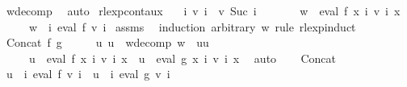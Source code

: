 \begin{isabellebody}
\ w{\isacharunderscore}{\kern0pt}decomp\ \isamarkupfalse%
\ auto\isanewline
{}\isamarkupfalse%
%
\endisatagproof
{\isafoldproof}%
%
\isadelimproof
\isanewline
%
\endisadelimproof
\isanewline
{}\isamarkupfalse%
\ rlexp{\isacharunderscore}{\kern0pt}cont{\isacharunderscore}{\kern0pt}aux{}{\isacharcolon}{\kern0pt}\isanewline
\ \ \ {\isachardoublequoteopen}{\isasymforall}i{\isachardot}{\kern0pt}\ v\ i\ {\isasymle}\ v\ {\isacharparenleft}{\kern0pt}Suc\ i{\isacharparenright}{\kern0pt}{\isachardoublequoteclose}\isanewline
\ \ \ \ \ \ \ {\isachardoublequoteopen}w\ {\isasymin}\ eval\ f\ {\isacharparenleft}{\kern0pt}{\isasymlambda}x{\isachardot}{\kern0pt}\ {\isasymUnion}i{\isachardot}{\kern0pt}\ v\ i\ x{\isacharparenright}{\kern0pt}{\isachardoublequoteclose}\isanewline
\ \ \ \ \ {\isachardoublequoteopen}w\ {\isasymin}\ {\isacharparenleft}{\kern0pt}{\isasymUnion}i{\isachardot}{\kern0pt}\ eval\ f\ {\isacharparenleft}{\kern0pt}v\ i{\isacharparenright}{\kern0pt}{\isacharparenright}{\kern0pt}{\isachardoublequoteclose}\isanewline
%
\isadelimproof
%
\endisadelimproof
%
\isatagproof
{}\isamarkupfalse%
\ assms\ \isamarkupfalse%
\ {\isacharparenleft}{\kern0pt}induction\ arbitrary{\isacharcolon}{\kern0pt}\ w\ rule{\isacharcolon}{\kern0pt}\ rlexp{\isachardot}{\kern0pt}induct{\isacharparenright}{\kern0pt}\isanewline
\ \ \isamarkupfalse%
\ {\isacharparenleft}{\kern0pt}Concat\ f\ g{\isacharparenright}{\kern0pt}\isanewline
\ \ \isamarkupfalse%
\ \isamarkupfalse%
\ u\ u{\isacharprime}{\kern0pt}\ \ w{\isacharunderscore}{\kern0pt}decomp{\isacharcolon}{\kern0pt}\ {\isachardoublequoteopen}w\ {\isacharequal}{\kern0pt}\ u{\isacharat}{\kern0pt}u{\isacharprime}{\kern0pt}{\isachardoublequoteclose}\isanewline
\ \ \ \ \ {\isachardoublequoteopen}u\ {\isasymin}\ eval\ f\ {\isacharparenleft}{\kern0pt}{\isasymlambda}x{\isachardot}{\kern0pt}\ {\isasymUnion}i{\isachardot}{\kern0pt}\ v\ i\ x{\isacharparenright}{\kern0pt}\ {\isasymand}\ u{\isacharprime}{\kern0pt}\ {\isasymin}\ eval\ g\ {\isacharparenleft}{\kern0pt}{\isasymlambda}x{\isachardot}{\kern0pt}\ {\isasymUnion}i{\isachardot}{\kern0pt}\ v\ i\ x{\isacharparenright}{\kern0pt}{\isachardoublequoteclose}\ \isamarkupfalse%
\ auto\isanewline
\ \ \isamarkupfalse%
\ Concat\ \isamarkupfalse%
\ {\isachardoublequoteopen}u\ {\isasymin}\ {\isacharparenleft}{\kern0pt}{\isasymUnion}i{\isachardot}{\kern0pt}\ eval\ f\ {\isacharparenleft}{\kern0pt}v\ i{\isacharparenright}{\kern0pt}{\isacharparenright}{\kern0pt}\ {\isasymand}\ u{\isacharprime}{\kern0pt}\ {\isasymin}\ {\isacharparenleft}{\kern0pt}{\isasymUnion}i{\isachardot}{\kern0pt}\ eval\ g\ {\isacharparenleft}{\kern0pt}v\ i{\isacharparenright}{\kern0pt}{\isacharparenright}{\kern0pt}{\isachardoublequoteclose}\ \isamarkupfalse%

\end{isabellebody}
